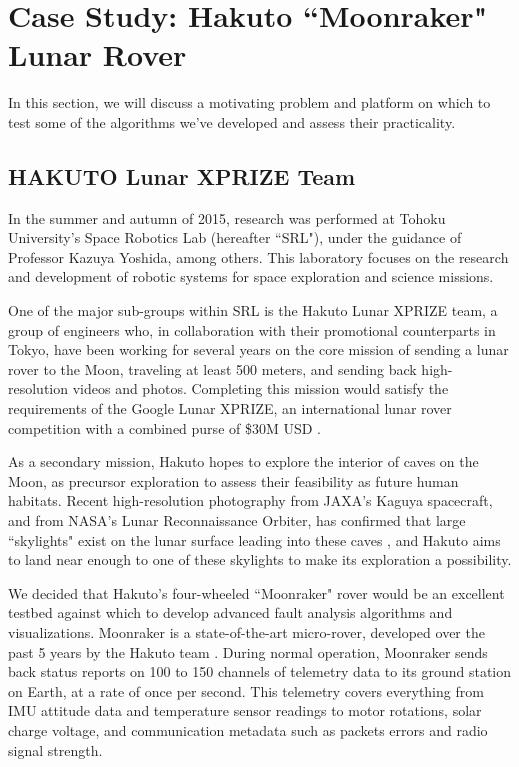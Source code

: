 \chapter{Case Study: Hakuto ``Moonraker" Lunar Rover}

In this section, we will discuss a motivating problem and platform on which to test some of the algorithms we've developed and assess their practicality.

\section{HAKUTO Lunar XPRIZE Team}

In the summer and autumn of 2015, research was performed at Tohoku University's Space Robotics Lab (hereafter ``SRL"), under the guidance of Professor Kazuya Yoshida, among others. This laboratory focuses on the research and development of robotic systems for space exploration and science missions.

One of the major sub-groups within SRL is the Hakuto Lunar XPRIZE team, a group of engineers who, in collaboration with their promotional counterparts in Tokyo, have been working for several years on the core mission of sending a lunar rover to the Moon, traveling at least 500 meters, and sending back high-resolution videos and photos. Completing this mission would satisfy the requirements of the Google Lunar XPRIZE, an international lunar rover competition with a combined purse of \$30M USD \cite{xprize}.

As a secondary mission, Hakuto hopes to explore the interior of caves on the Moon, as precursor exploration to assess their feasibility as future human habitats. Recent high-resolution photography from JAXA's Kaguya spacecraft, and from NASA's Lunar Reconnaissance Orbiter, has confirmed that large ``skylights" exist on the lunar surface leading into these caves \cite{rabbithole}, and Hakuto aims to land near enough to one of these skylights to make its exploration a possibility.

We decided that Hakuto's four-wheeled ``Moonraker" rover would be an excellent testbed against which to develop advanced fault analysis algorithms and visualizations. Moonraker is a state-of-the-art micro-rover, developed over the past 5 years by the Hakuto team \cite{walker2015update}. During normal operation, Moonraker sends back status reports on 100 to 150 channels of telemetry data to its ground station on Earth, at a rate of once per second. This telemetry covers everything from IMU attitude data and temperature sensor readings to motor rotations, solar charge voltage, and communication metadata such as packets errors and radio signal strength.

